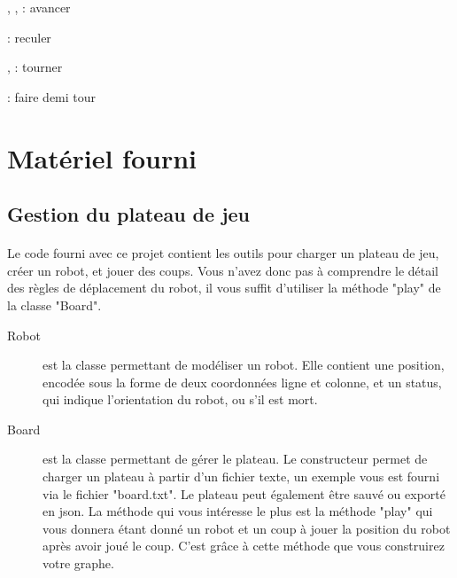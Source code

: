 \documentclass[a4paper]{article}
\newcommand{\li}{\linewidth}
\begin{document}
\begin{center}

  \vspace{5mm}
  \begin{minipage}[b]{0.2\li}
    \centering
    \fwdone, \fwdtwo, \fwdthree : avancer
  \end{minipage}
  \begin{minipage}[b]{0.2\li}
    \centering
    \bwdone : reculer
  \end{minipage}
  \begin{minipage}[b]{0.2\li}
    \centering
    \turnleft, \turnright : tourner
  \end{minipage}
  \begin{minipage}[b]{0.2\li}
    \centering
    \uturn : faire demi tour
  \end{minipage}
\end{center}

\section{Matériel fourni}

\subsection{Gestion du plateau de jeu}

\paragraph{}Le code fourni avec ce projet contient les outils pour charger un
plateau de jeu, créer un robot, et jouer des coups. Vous n'avez donc pas à
comprendre le détail des règles de déplacement du robot, il vous suffit
d'utiliser la méthode "play" de la classe "Board".

\begin{description}
  \item[Robot] est la classe permettant de modéliser un robot. Elle contient une
    position, encodée sous la forme de deux coordonnées ligne et colonne, et un
    status, qui indique l'orientation du robot, ou s'il est mort.
  \item[Board] est la classe permettant de gérer le plateau. Le constructeur 
    permet de charger un plateau à partir d'un fichier texte, un exemple vous
    est fourni via le fichier "board.txt". Le plateau peut également être 
    sauvé ou exporté en json. La méthode qui vous intéresse le plus est la
    méthode "play" qui vous donnera étant donné un robot et un coup à
    jouer la position du robot après avoir joué le coup. C'est grâce à cette
    méthode que vous construirez votre graphe.
\end{description}
\end{document}
